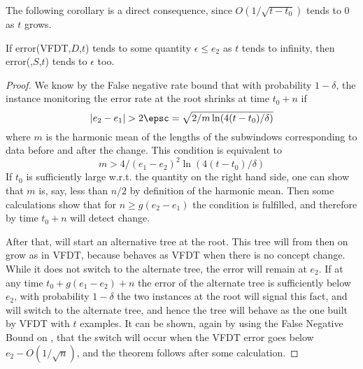 The following corollary is a direct consequence, since $O(1/\sqrt{t-t_0})$
tends to $0$ as $t$ grows. 

\begin{corollary}
If error(VFDT,$D$,$t$) tends to some quantity $\epsilon\le e_2$
as $t$ tends to infinity,
then error(\HWTsAdwin,$S$,$t$) 
tends to $\epsilon$ too. %
\end{corollary}

\begin{proof}
We know by the \adwin False negative rate bound that with probability 
$1- \delta$, the \adwin instance monitoring the error rate at the root 
shrinks at time $t_0+n$ if
$$
|e_2-e_1|> 2 \epsc = \sqrt{2/m \ln(4(t-t_0)/\delta)}
$$
where $m$ is the harmonic mean of the lengths of the subwindows 
corresponding to data before and after the change. 
This condition is equivalent to 
$$
m > 4/(e_1-e_2)^2 \ln(4(t-t_0)/\delta)
$$
If $t_0$ is sufficiently large w.r.t. the quantity on the right
hand side, one can show that $m$ is, say, less than $n/2$
by definition of the harmonic mean. 
Then some calculations show that for $n \ge g(e_2-e_1)$ 
the condition is fulfilled, and therefore by time $t_0+n$
\adwin will detect change. 

After that, \HWTsAdwin will start an alternative tree at the root.
This tree will from then on grow as in VFDT, 
because \HWTsAdwin{} behaves as VFDT when there is no concept change. 
While it does not switch to the alternate tree, the error will
remain at $e_2$.
If at any time $t_0+g(e_1-e_2)+n$ the error of the alternate tree is sufficiently below 
$e_2$, with probability $1-\delta$ the two \adwin instances
at the root will signal this fact, and \HWTsAdwin will switch to the alternate
tree, and hence the tree will behave as the one built by 
VFDT with $t$ examples. It can be shown, again by using
the False Negative Bound on \adwin, that 
the switch will occur when the VFDT error 
goes below $e_2-O(1/\sqrt{n})$, and the theorem follows 
after some calculation. 
\end{proof}




